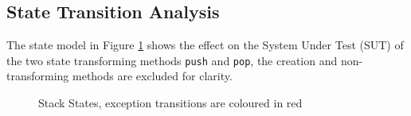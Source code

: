 \documentclass [12pt, a4paper, twoside, titlepage] {article}
\begin{document}
\subsection{State Transition Analysis}

The  state model in Figure \ref{stackStates} shows the effect on the System Under Test (SUT) 
of the two state transforming methods \texttt{push} and \texttt{pop}, the creation and 
non-transforming methods are excluded for clarity.
\begin{figure}[H]
\setlength\fboxsep{0pt}
\setlength\fboxrule{0.5pt}
\caption{Stack States, exception transitions are coloured in red}
\label{stackStates}
\end{figure}
\end{document}
